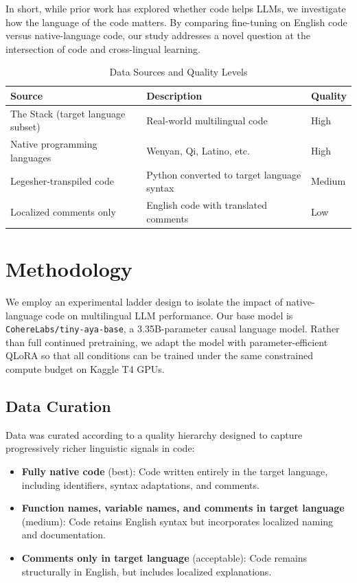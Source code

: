 \documentclass[conference]{IEEEtran}
\begin{document}
In short, while prior work has explored whether code helps LLMs, we investigate how the language of the code matters. By comparing fine-tuning on English code versus native-language code, our study addresses a novel question at the intersection of code and cross-lingual learning. 

\begin{table}[h]
  \centering
  \caption{Data Sources and Quality Levels}
  \begin{tabular}{|p{5cm}|p{5cm}|p{2.5cm}|}
    \hline
    \textbf{Source} & \textbf{Description} & \textbf{Quality} \\
    \hline
    The Stack (target language subset) & Real-world multilingual code & High \\
    \hline
    Native programming languages & Wenyan, Qi, Latino, etc. & High \\
    \hline
    Legesher-transpiled code & Python converted to target language syntax & Medium \\
    \hline
    Localized comments only & English code with translated comments & Low \\
    \hline
\end{tabular}
\end{table}

\section{Methodology}
We employ an experimental ladder design to isolate the impact of native-language code on multilingual LLM performance. Our base model is \texttt{CohereLabs/tiny-aya-base}, a 3.35B-parameter causal language model. Rather than full continued pretraining, we adapt the model with parameter-efficient QLoRA so that all conditions can be trained under the same constrained compute budget on Kaggle T4 GPUs.

\subsection{Data Curation}
Data was curated according to a quality hierarchy designed to capture progressively richer linguistic signals in code:

\begin{itemize} 
\item \textbf{Fully native code} (best): Code written entirely in the target language, including identifiers, syntax adaptations, and comments. 
\item \textbf{Function names, variable names, and comments in target language} (medium): Code retains English syntax but incorporates localized naming and documentation. 
\item \textbf{Comments only in target language} (acceptable): Code remains structurally in English, but includes localized explanations. 
\end{itemize}
\end{document}

